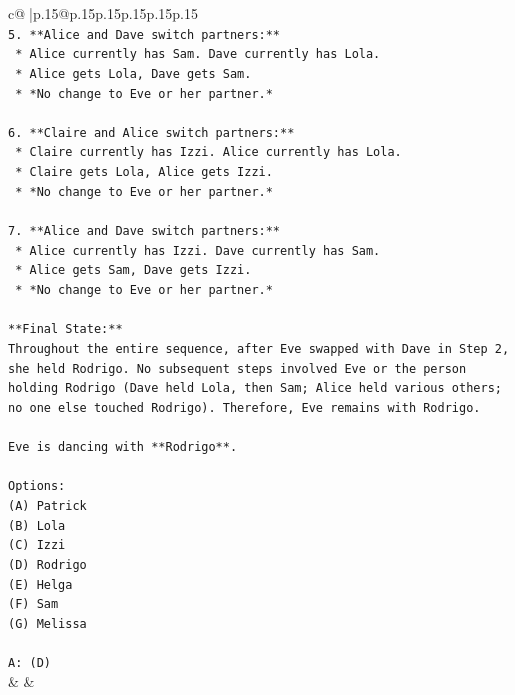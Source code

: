 \documentclass{article}
\begin{document}
{\begin{supertabular}{c@{$\;$}|p{.15\linewidth}@{}p{.15\linewidth}p{.15\linewidth}p{.15\linewidth}p{.15\linewidth}p{.15\linewidth}}
{{{\\ 
\texttt{5.  **Alice and Dave switch partners:**} \\
\texttt{    *   Alice currently has Sam. Dave currently has Lola.} \\
\texttt{    *   Alice gets Lola, Dave gets Sam.} \\
\texttt{    *   *No change to Eve or her partner.*} \\
\\ 
\texttt{6.  **Claire and Alice switch partners:**} \\
\texttt{    *   Claire currently has Izzi. Alice currently has Lola.} \\
\texttt{    *   Claire gets Lola, Alice gets Izzi.} \\
\texttt{    *   *No change to Eve or her partner.*} \\
\\ 
\texttt{7.  **Alice and Dave switch partners:**} \\
\texttt{    *   Alice currently has Izzi. Dave currently has Sam.} \\
\texttt{    *   Alice gets Sam, Dave gets Izzi.} \\
\texttt{    *   *No change to Eve or her partner.*} \\
\\ 
\texttt{**Final State:**} \\
\texttt{Throughout the entire sequence, after Eve swapped with Dave in Step 2, she held Rodrigo. No subsequent steps involved Eve or the person holding Rodrigo (Dave held Lola, then Sam; Alice held various others; no one else touched Rodrigo). Therefore, Eve remains with Rodrigo.} \\
\\ 
\texttt{Eve is dancing with **Rodrigo**.} \\
\\ 
\texttt{Options:} \\
\texttt{(A) Patrick} \\
\texttt{(B) Lola} \\
\texttt{(C) Izzi} \\
\texttt{(D) Rodrigo} \\
\texttt{(E) Helga} \\
\texttt{(F) Sam} \\
\texttt{(G) Melissa} \\
\\ 
\texttt{A: (D)} \\
            }
        }
    }
    & & \\ \\


\end{supertabular}}
\end{document}
